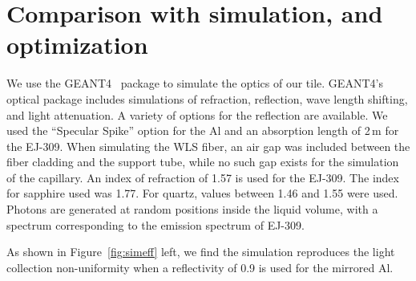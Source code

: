 \documentclass[review]{elsarticle}
\begin{document}
\section{Comparison with simulation, and optimization}
We use the GEANT4~\cite{Agostinelli2003250} package to simulate the
optics of our tile. GEANT4's optical package includes simulations of
refraction, reflection, wave length shifting, and light attenuation.
A variety of options for the reflection are available. We used the
``Specular Spike'' option for the Al and an absorption length of 2\,m for
the EJ-309. When simulating the WLS fiber, an air gap was included
between the fiber cladding and the support tube, while no such gap
exists for the simulation of the capillary. An index of refraction of
1.57 is used for the EJ-309. The index for sapphire used was 1.77.
For quartz, values between 1.46 and 1.55 were used. Photons are
generated at random positions inside the liquid volume, with a
spectrum corresponding to the emission spectrum of EJ-309.

As shown in Figure~\ref{fig:simeff} left, we find the simulation
reproduces the light collection non-uniformity when a reflectivity of
0.9 is used for the mirrored Al.
\end{document}
